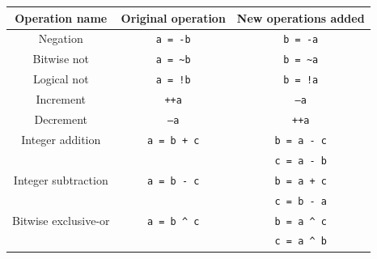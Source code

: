 \begin{center}
\begin{tabular}{|c|c|c|}
  \hline
  Operation name & Original operation & New operations added \\
  \hline \hline 
  Negation & \texttt{a = -b} & \texttt{b = -a} \\
  \hline    
  Bitwise not& \texttt{a = \textasciitilde b} & \texttt{b = \textasciitilde a} \\
  \hline
  Logical not& \texttt{a = !b} & \texttt{b = !a} \\
  \hline    
  Increment & \texttt{++a} & \texttt{--a} \\
  \hline    
  Decrement & \texttt{--a} & \texttt{++a} \\
  \hline
  Integer addition & \texttt{a = b + c} & \texttt{b = a - c} \\
  {} & {} & \texttt{c = a - b} \\
  \hline
  Integer subtraction & \texttt{a = b - c} & \texttt{b = a + c} \\
  {} & {} & \texttt{c = b - a} \\
  \hline
  Bitwise exclusive-or & \texttt{a = b \textasciicircum{ }c} & \texttt{b = a \textasciicircum{ }c} \\
  {} & {} & \texttt{c = a \textasciicircum{ }b} \\
  \hline
\end{tabular}
\end{center}

